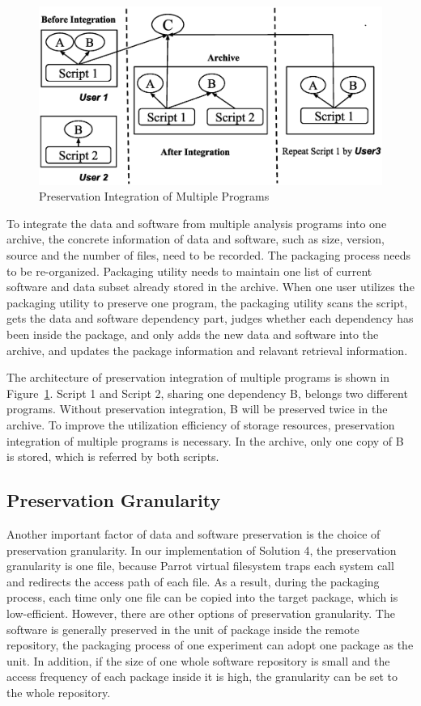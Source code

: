 \documentclass{acm_proc_article-sp}
\begin{document}
\begin{figure}
\centering
\includegraphics[width=1\columnwidth]{preservation-integration.eps}
\caption{Preservation Integration of Multiple Programs}
\label{fig:Preservation integration}
\end{figure}

To integrate the data and software from multiple analysis programs into one
archive, the concrete information of data and software, such as size, version,
source and the number of files, need to be recorded. 
The packaging
process needs to be re-organized. Packaging utility needs to maintain one list
of current software and data subset already stored in the archive. When one
user utilizes the packaging utility to preserve one program, the
packaging utility scans the script, gets the data and software dependency
part, judges whether each dependency has been inside the package, and only adds
the new data and software into the archive, and updates the package information
and relavant retrieval information.

The architecture of preservation integration of multiple programs is shown in
Figure~\ref{fig:Preservation integration}. Script 1 and Script 2, sharing one
dependency B, belongs two different programs. Without preservation
integration, B will be preserved twice in the archive. To improve the utilization efficiency of storage resources,
preservation integration of multiple programs is necessary. In the archive,
only one copy of B is stored, which is referred by both scripts.

\subsection{Preservation Granularity}

Another important factor of data and software preservation is the choice of
preservation granularity. In our implementation of Solution 4, the preservation granularity is one
file, because Parrot virtual filesystem traps each system call and redirects
the access path of each file. As a result, during the packaging process, each
time only one file can be copied into the target package, which is
low-efficient. However, there are other options of preservation granularity.
The software is generally preserved in the unit of package inside the remote
repository, the packaging process of one experiment can adopt one package as
the unit. In addition, if the size of one whole software repository is small
and the access frequency of each package inside it is high, the granularity can
be set to the whole repository.
\end{document}
